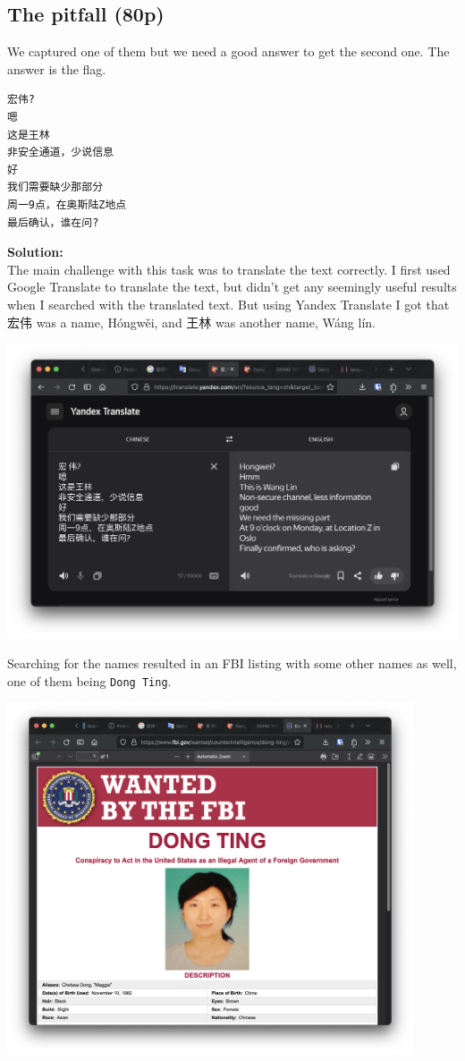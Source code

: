 \newpage
\subsection{The pitfall (80p)}
We captured one of them but we need a good answer to get the second one. The answer is the flag.
\begin{verbatim}
宏伟?
嗯
这是王林
非安全通道，少说信息
好
我们需要缺少那部分
周一9点，在奥斯陆Z地点
最后确认，谁在问?
\end{verbatim}

\textbf{Solution:}\\
The main challenge with this task was to translate the text correctly.
I first used Google Translate to translate the text, but didn't get any seemingly useful results when I searched with the translated text.
But using Yandex Translate I got that 宏伟 was a name, Hóngwěi, and 王林 was another name, Wáng lín.

\begin{center}
    \includegraphics[width=16cm]{img/OSINT/The pitfall/Screenshot 2023-11-09 at 21.10.33.png}
\end{center}

Searching for the names resulted in an FBI listing with some other names as well, one of them being \texttt{Dong Ting}.

\begin{center}
    \includegraphics[width=12cm]{img/OSINT/The pitfall/Screenshot 2023-11-09 at 21.11.12.png}
\end{center}

